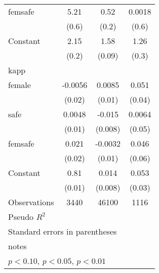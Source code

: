 \begin{table}[htbp]
\begin{tabular}{l*{3}{c}}
\addlinespace
femsafe             &        5.21\sym{***}&        0.52\sym{***}&      0.0018         \\
                    &       (0.6)         &       (0.2)         &       (0.6)         \\
\addlinespace
Constant            &        2.15\sym{***}&        1.58\sym{***}&        1.26\sym{***}\\
                    &       (0.2)         &      (0.09)         &       (0.3)         \\
\midrule
kapp                &                     &                     &                     \\
female              &     -0.0056         &      0.0085         &       0.051         \\
                    &      (0.02)         &      (0.01)         &      (0.04)         \\
\addlinespace
safe                &      0.0048         &      -0.015\sym{*}  &      0.0064         \\
                    &      (0.01)         &     (0.008)         &      (0.05)         \\
\addlinespace
femsafe             &       0.021         &     -0.0032         &       0.046         \\
                    &      (0.02)         &      (0.01)         &      (0.06)         \\
\addlinespace
Constant            &        0.81\sym{***}&       0.014\sym{*}  &       0.053\sym{*}  \\
                    &      (0.01)         &     (0.008)         &      (0.03)         \\
\midrule
Observations        &        3440         &       46100         &        1116         \\
Pseudo \(R^{2}\)    &                     &                     &                     \\
\bottomrule
\multicolumn{4}{l}{\footnotesize Standard errors in parentheses}\\
\multicolumn{4}{l}{\footnotesize notes}\\
\multicolumn{4}{l}{\footnotesize \sym{*} \(p<0.10\), \sym{**} \(p<0.05\), \sym{***} \(p<0.01\)}\\
\end{tabular}
\end{table}
